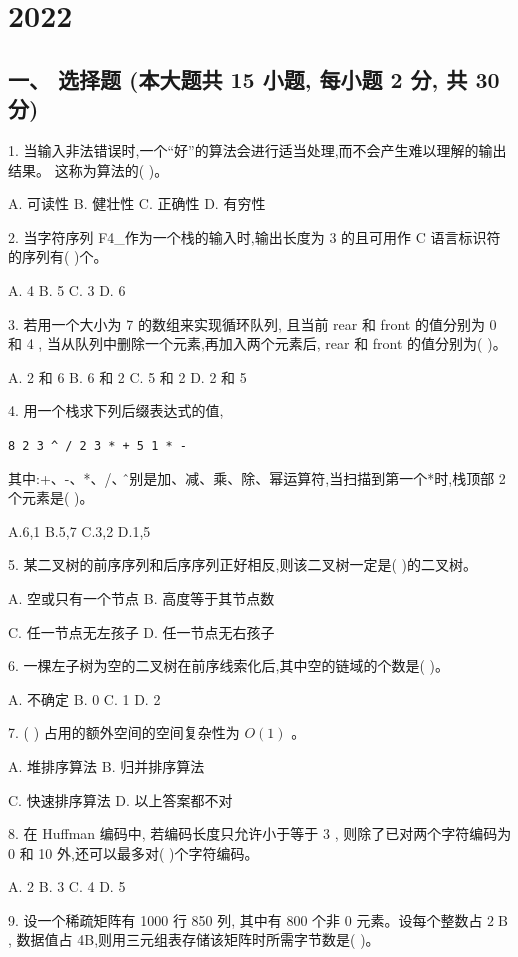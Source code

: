 \chapter{2022}

\section*{一、 选择题 (本大题共 15 小题, 每小题 2 分, 共 30 分)}

1. 当输入非法错误时,一个“好”的算法会进行适当处理,而不会产生难以理解的输出结果。 这称为算法的(   )。

A. 可读性 B. 健壮性 C. 正确性 D. 有穷性

2. 当字符序列 F4\_作为一个栈的输入时,输出长度为 3 的且可用作 C 语言标识符的序列有(   )个。

A. 4 B. 5 C. 3 D. 6

3. 若用一个大小为 7 的数组来实现循环队列, 且当前 rear 和 front 的值分别为 0 和 4 , 当从队列中删除一个元素,再加入两个元素后, rear 和 front 的值分别为(   )。

A. 2 和 6 B. 6 和 2 C. 5 和 2 D. 2 和 5

4. 用一个栈求下列后缀表达式的值,
\begin{center}
    \verb|8 2 3 ^ / 2 3 * + 5 1 * -|
\end{center}

其中:+、-、*、/、\^分别是加、减、乘、除、幂运算符,当扫描到第一个*时,栈顶部 2 个元素是(   )。

A.6,1 B.5,7 C.3,2 D.1,5

5. 某二叉树的前序序列和后序序列正好相反,则该二叉树一定是(   )的二叉树。

A. 空或只有一个节点 B. 高度等于其节点数

C. 任一节点无左孩子 D. 任一节点无右孩子

6. 一棵左子树为空的二叉树在前序线索化后,其中空的链域的个数是(   )。

A. 不确定 B. 0 C. 1 D. 2

7. (   ) 占用的额外空间的空间复杂性为 \(O\left( 1\right)\) 。

A. 堆排序算法 B. 归并排序算法

C. 快速排序算法 D. 以上答案都不对

8. 在 Huffman 编码中, 若编码长度只允许小于等于 3 , 则除了已对两个字符编码为 0 和 10 外,还可以最多对(   )个字符编码。

A. 2 B. 3 C. 4 D. 5

9. 设一个稀疏矩阵有 1000 行 850 列, 其中有 800 个非 0 元素。设每个整数占 \(2\mathrm{\;B}\) , 数据值占 4B,则用三元组表存储该矩阵时所需字节数是(   )。

